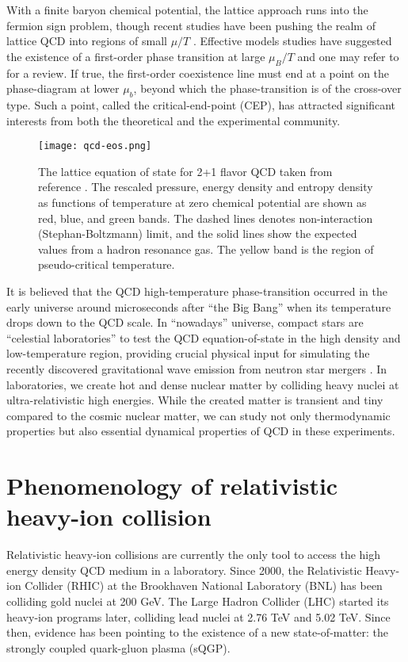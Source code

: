 With a finite baryon chemical potential, the lattice approach runs into the fermion sign problem, though recent studies have been pushing the realm of lattice QCD into regions of small $\mu/T$  \cite{Gunther:2016vcp,Bazavov:2017dus}.
Effective models studies have suggested the existence of a first-order phase transition at large $\mu_B/T$ and one may refer to \cite{Fukushima:2010bq} for a review.
If true, the first-order coexistence line must end at a point on the phase-diagram at lower $\mu_b$, beyond which the phase-transition is of the cross-over type.
Such a point, called the critical-end-point (CEP), has attracted significant interests from both the theoretical and the experimental community.

\begin{figure}
\singlespacing 
    \centering
    \texttt{[image: qcd-eos.png]}
    \caption[The lattice equation of state for 2+1 flavor QCD taken from]{The lattice equation of state for 2+1 flavor QCD taken from reference \cite{Bazavov:2014pvz}. The rescaled pressure, energy density and entropy density as functions of temperature at zero chemical potential are shown as red, blue, and green bands. The dashed lines denotes non-interaction (Stephan-Boltzmann) limit, and the solid lines show the expected values from a hadron resonance gas. The yellow band is the region of pseudo-critical temperature.}
    \label{fig:qcd_eos}
\end{figure}

It is believed that the QCD high-temperature phase-transition occurred in the early universe around microseconds after ``the Big Bang'' when its temperature drops down to the QCD scale.
In ``nowadays'' universe, compact stars are ``celestial laboratories'' to test the QCD equation-of-state in the high density and low-temperature region, providing crucial physical input for simulating the recently discovered gravitational wave emission from neutron star mergers \cite{TheLIGOScientific:2017qsa}.
In laboratories, we create hot and dense nuclear matter by colliding heavy nuclei at ultra-relativistic high energies.
While the created matter is transient and tiny compared to the cosmic nuclear matter, we can study not only thermodynamic properties but also essential dynamical properties of QCD in these experiments.

\section{Phenomenology of relativistic heavy-ion collision}
Relativistic heavy-ion collisions are currently the only tool to access the high energy density QCD medium in a laboratory.
Since 2000, the Relativistic Heavy-ion Collider (RHIC) at the Brookhaven National Laboratory (BNL) has been colliding gold nuclei at 200 GeV. 
The Large Hadron Collider (LHC) started its heavy-ion programs later, colliding lead nuclei at 2.76 TeV and 5.02 TeV.
Since then, evidence has been pointing to the existence of a new state-of-matter: the strongly coupled quark-gluon plasma (sQGP).

